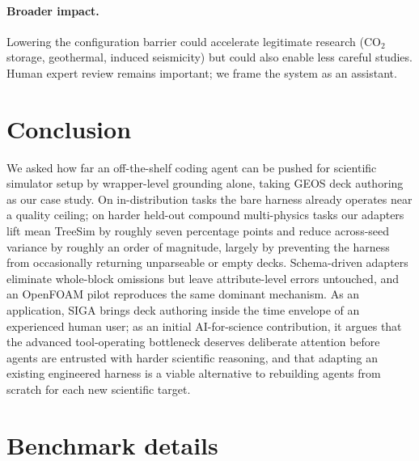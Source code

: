 \documentclass{article}
\begin{document}
\paragraph{Broader impact.} Lowering the configuration barrier could accelerate legitimate research (CO$_2$ storage, geothermal, induced seismicity) but could also enable less careful studies. Human expert review remains important; we frame the system as an assistant.


\section{Conclusion}
\label{sec:conclusion}

We asked how far an off-the-shelf coding agent can be pushed for scientific simulator setup by wrapper-level grounding alone, taking GEOS deck authoring as our case study. On in-distribution tasks the bare harness already operates near a quality ceiling; on harder held-out compound multi-physics tasks our adapters lift mean TreeSim by roughly seven percentage points and reduce across-seed variance by roughly an order of magnitude, largely by preventing the harness from occasionally returning unparseable or empty decks. Schema-driven adapters eliminate whole-block omissions but leave attribute-level errors untouched, and an OpenFOAM pilot reproduces the same dominant mechanism. As an application, SIGA brings deck authoring inside the time envelope of an experienced human user; as an initial AI-for-science contribution, it argues that the advanced tool-operating bottleneck deserves deliberate attention before agents are entrusted with harder scientific reasoning, and that adapting an existing engineered harness is a viable alternative to rebuilding agents from scratch for each new scientific target.

\medskip

{
\small
}





\appendix

\section{Benchmark details}
\label{app:bench}
\end{document}

